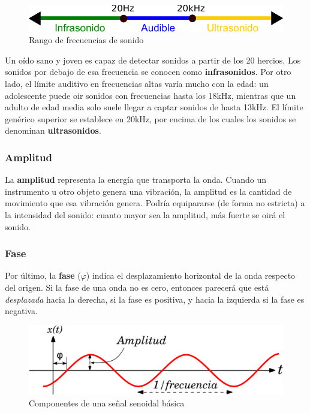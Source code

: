 \begin{figure}[h]
  \centering
  \includegraphics[scale=0.8]{desarrollo/rango_freq}
  \caption{Rango de frecuencias de sonido}
\end{figure}


Un oído sano y joven es capaz de detectar sonidos a partir de los 20
hercios. Los sonidos por debajo de esa frecuencia se conocen como
\textbf{infrasonidos}. Por otro lado, el límite auditivo en
frecuencias altas varía mucho con la edad: un adolescente puede oir
sonidos con frecuencias hasta los 18kHz, mientras que un adulto de
edad media solo suele llegar a captar sonidos de hasta 13kHz. El
límite genérico superior se establece en 20kHz, por encima de los
cuales los sonidos se denominan \textbf{ultrasonidos}.


\subsubsection{Amplitud}
La \textbf{amplitud} representa la energía que transporta la
onda. Cuando un instrumento u otro objeto genera una vibración, la
amplitud es la cantidad de movimiento que esa vibración genera.
Podría equipararse (de forma no estricta) a la intensidad del sonido:
cuanto mayor sea la amplitud, más fuerte se oirá el sonido.

\subsubsection{Fase}
Por último, la \textbf{fase} ($\varphi$) indica el desplazamiento
horizontal de la onda respecto del origen. Si la fase de una onda no
es cero, entonces parecerá que está \textit{desplazada} hacia la
derecha, si la fase es positiva, y hacia la izquierda si la fase es
negativa.
\begin{figure}[h]\centering
    \includegraphics[scale=0.7]{desarrollo/onda}
    \caption{Componentes de una señal senoidal básica}
\end{figure}
